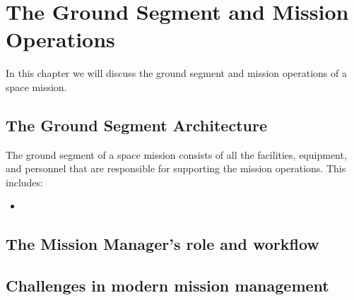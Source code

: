 \section{The Ground Segment and Mission Operations}
In this chapter we will discuss the ground segment and mission operations of a space mission. 

\subsection{The Ground Segment Architecture}
The ground segment of a space mission consists of all the facilities, equipment, and personnel that are responsible for supporting the mission operations. This includes:
\begin{itemize}
    \item 
\end{itemize}


\subsection{The Mission Manager's role and workflow}


\subsection{Challenges in modern mission management}